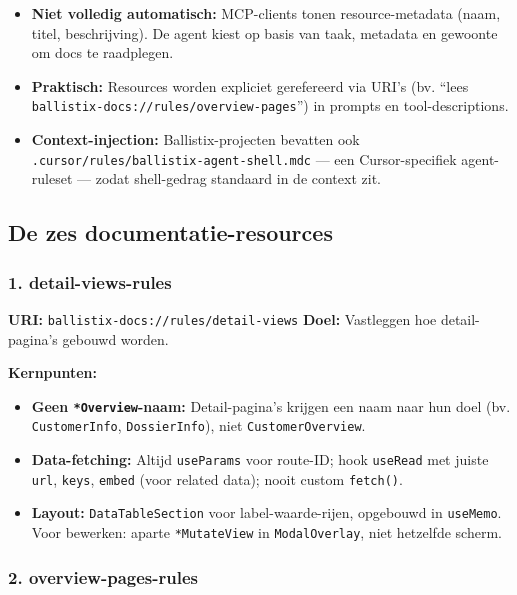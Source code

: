 \begin{itemize}
  \item \textbf{Niet volledig automatisch:} MCP-clients tonen resource-metadata (naam, titel, beschrijving). De agent kiest op basis van taak, metadata en gewoonte om docs te raadplegen.
  \item \textbf{Praktisch:} Resources worden expliciet gerefereerd via URI's (bv. ``lees \texttt{ballistix-docs://rules/overview-pages}'') in prompts en tool-descriptions.
  \item \textbf{Context-injection:} Ballistix-projecten bevatten ook \texttt{.cursor/rules/ballistix-agent-shell.mdc} — een Cursor-specifiek agent-ruleset — zodat shell-gedrag standaard in de context zit.
\end{itemize}

\subsection{De zes documentatie-resources}

\subsubsection{1. detail-views-rules}

\noindent
\textbf{URI:} \texttt{ballistix-docs://rules/detail-views} \newline
\textbf{Doel:} Vastleggen hoe detail-pagina's gebouwd worden.

\noindent
\textbf{Kernpunten:}

\begin{itemize}
  \item \textbf{Geen \texttt{*Overview}-naam:} Detail-pagina's krijgen een naam naar hun doel (bv. \texttt{CustomerInfo}, \texttt{DossierInfo}), niet \texttt{CustomerOverview}.
  \item \textbf{Data-fetching:} Altijd \texttt{useParams} voor route-ID; hook \texttt{useRead} met juiste \texttt{url}, \texttt{keys}, \texttt{embed} (voor related data); nooit custom \texttt{fetch()}.
  \item \textbf{Layout:} \texttt{DataTableSection} voor label-waarde-rijen, opgebouwd in \texttt{useMemo}. Voor bewerken: aparte \texttt{*MutateView} in \texttt{ModalOverlay}, niet hetzelfde scherm.
\end{itemize}

\subsubsection{2. overview-pages-rules}

